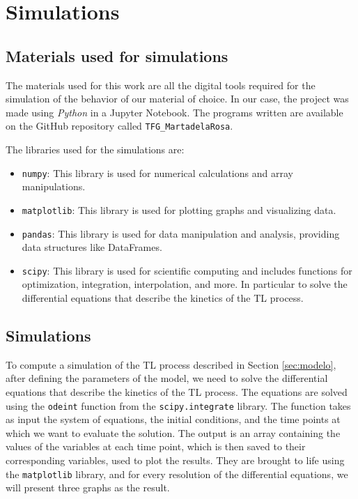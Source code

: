 \chapter{Simulations} \label{ch:4}

\section{Materials used for simulations} \label{sec:materials}

The materials used for this work are all the digital tools required for the simulation of the behavior of our material of choice. In our case, the project was made using \textit{Python} in a Jupyter Notebook. The programs written are available on the GitHub repository called \texttt{TFG\_MartadelaRosa}. 

\vspace{10pt}

The libraries used for the simulations are:
\begin{itemize}
    \item \texttt{numpy}: This library is used for numerical calculations and array manipulations.
    \item \texttt{matplotlib}: This library is used for plotting graphs and visualizing data.
    \item \texttt{pandas}: This library is used for data manipulation and analysis, providing data structures like DataFrames.
    \item \texttt{scipy}: This library is used for scientific computing and includes functions for optimization, integration, interpolation, and more. In particular to solve the differential equations that describe the kinetics of the TL process.
\end{itemize}



\section{Simulations} \label{sec:simulations}

To compute a simulation of the TL process described in Section \ref{sec:modelo}, after defining the parameters of the model, we need to solve the differential equations that describe the kinetics of the TL process. The equations are solved using the \texttt{odeint} function from the \texttt{scipy.integrate} library. The function takes as input the system of equations, the initial conditions, and the time points at which we want to evaluate the solution. The output is an array containing the values of the variables at each time point, which is then saved to their corresponding variables, used to plot the results. They are brought to life using the \texttt{matplotlib} library, and for every resolution of the differential equations, we will present three graphs as the result.

